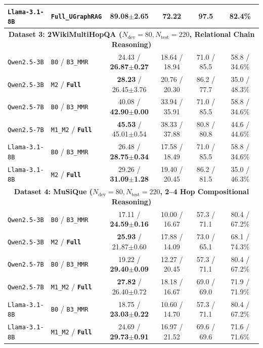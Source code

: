 \documentclass[11pt]{article}
\begin{document}
\begin{table}[t]
{{\begin{tabular}{llcccc}
\texttt{Llama-3.1-8B} & \textbf{\texttt{Full\_UGraphRAG}} & \textbf{89.08$\pm$2.65} & \textbf{72.22} & 97.5 & 82.4\% \\
\midrule
\multicolumn{6}{c}{\textbf{Dataset 3: 2WikiMultiHopQA ($N_{\text{dev}}=80, N_{\text{test}}=220$, Relational Chain Reasoning)}} \\
\midrule
\texttt{Qwen2.5-3B} & \texttt{B0} / \texttt{B3\_MMR} & 24.43 / \textbf{26.87$\pm$0.27} & 18.64 / 18.94 & 71.0 / 85.5 & 58.8 / 34.6\% \\
\texttt{Qwen2.5-3B} & \texttt{M2} / \textbf{\texttt{Full}} & \textbf{28.23} / 26.45$\pm$3.76 & 20.76 / 20.30 & 86.2 / 77.7 & 35.0 / 48.3\% \\
\texttt{Qwen2.5-7B} & \texttt{B0} / \texttt{B3\_MMR} & 40.08 / \textbf{42.90$\pm$0.00} & 33.94 / 35.91 & 71.0 / 85.5 & 58.8 / 34.6\% \\
\texttt{Qwen2.5-7B} & \texttt{M1\_M2} / \textbf{\texttt{Full}} & \textbf{45.53} / 45.01$\pm$0.54 & 38.33 / 37.88 & 80.8 / 80.8 & 44.6 / 44.6\% \\
\texttt{Llama-3.1-8B} & \texttt{B0} / \texttt{B3\_MMR} & 26.48 / \textbf{28.75$\pm$0.34} & 17.58 / 18.49 & 71.0 / 85.5 & 58.8 / 34.6\% \\
\texttt{Llama-3.1-8B} & \texttt{M2} / \textbf{\texttt{Full}} & 29.26 / \textbf{31.09$\pm$1.28} & 19.40 / 20.45 & 86.2 / 81.5 & 35.0 / 46.3\% \\
\midrule
\multicolumn{6}{c}{\textbf{Dataset 4: MuSiQue ($N_{\text{dev}}=80, N_{\text{test}}=220$, 2--4 Hop Compositional Reasoning)}} \\
\midrule
\texttt{Qwen2.5-3B} & \texttt{B0} / \texttt{B3\_MMR} & 17.11 / \textbf{24.59$\pm$0.16} & 10.00 / 16.67 & 57.3 / 71.1 & 80.4 / 67.2\% \\
\texttt{Qwen2.5-3B} & \texttt{M2} / \textbf{\texttt{Full}} & \textbf{25.93} / 21.87$\pm$0.60 & 17.88 / 14.09 & 73.0 / 65.1 & 68.1 / 74.3\% \\
\texttt{Qwen2.5-7B} & \texttt{B0} / \texttt{B3\_MMR} & 19.22 / \textbf{29.40$\pm$0.09} & 12.27 / 20.45 & 57.3 / 71.1 & 80.4 / 67.2\% \\
\texttt{Qwen2.5-7B} & \texttt{M1\_M2} / \textbf{\texttt{Full}} & \textbf{27.82} / 26.40$\pm$0.72 & 18.18 / 16.67 & 69.0 / 69.0 & 71.9 / 71.9\% \\
\texttt{Llama-3.1-8B} & \texttt{B0} / \texttt{B3\_MMR} & 18.75 / \textbf{23.03$\pm$0.22} & 10.60 / 14.70 & 57.3 / 71.1 & 80.4 / 67.2\% \\
\texttt{Llama-3.1-8B} & \texttt{M1\_M2} / \textbf{\texttt{Full}} & 24.69 / \textbf{29.73$\pm$0.91} & 16.97 / 21.52 & 69.6 / 69.6 & 71.6 / 71.6\% \\

\end{tabular}}}
\end{table}
\end{document}
